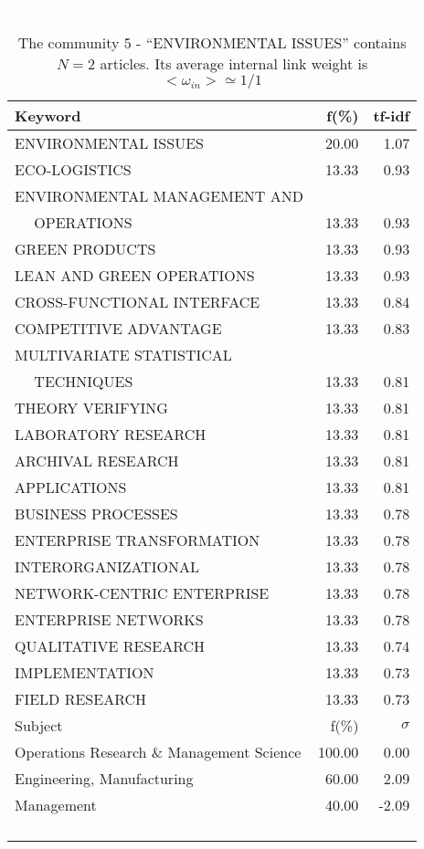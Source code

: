 \documentclass[a4paper,11pt]{report}
\begin{document}
\begin{landscape}
\begin{table}[!ht]
\caption{The community 5 - ``ENVIRONMENTAL ISSUES'' contains $N = 2$ articles. Its average internal link weight is $<\omega_{in}> \simeq 1/1$ }
\textcolor{white}{aa}\\
{\scriptsize\begin{tabular}{|l r  r|}
\hline
Keyword & f(\%) & tf-idf \\
\hline
ENVIRONMENTAL ISSUES & 20.00 & 1.07\\
ECO-LOGISTICS & 13.33 & 0.93\\
ENVIRONMENTAL MANAGEMENT AND &  &\\
$\quad$ OPERATIONS & 13.33 & 0.93\\
GREEN PRODUCTS & 13.33 & 0.93\\
LEAN AND GREEN OPERATIONS & 13.33 & 0.93\\
CROSS-FUNCTIONAL INTERFACE & 13.33 & 0.84\\
COMPETITIVE ADVANTAGE & 13.33 & 0.83\\
MULTIVARIATE STATISTICAL &  &\\
$\quad$ TECHNIQUES & 13.33 & 0.81\\
THEORY VERIFYING & 13.33 & 0.81\\
LABORATORY RESEARCH & 13.33 & 0.81\\
ARCHIVAL RESEARCH & 13.33 & 0.81\\
APPLICATIONS & 13.33 & 0.81\\
BUSINESS PROCESSES & 13.33 & 0.78\\
ENTERPRISE TRANSFORMATION & 13.33 & 0.78\\
INTERORGANIZATIONAL & 13.33 & 0.78\\
NETWORK-CENTRIC ENTERPRISE & 13.33 & 0.78\\
ENTERPRISE NETWORKS & 13.33 & 0.78\\
QUALITATIVE RESEARCH & 13.33 & 0.74\\
IMPLEMENTATION & 13.33 & 0.73\\
FIELD RESEARCH & 13.33 & 0.73\\
\hline
\hline
Subject & f(\%) & $\sigma$\\
\hline
Operations Research \& Management Science & 100.00 & 0.00\\
Engineering, Manufacturing & 60.00 & 2.09\\
Management & 40.00 & -2.09\\
 &  & \\
 &  & \\
 &  & \\
 &  & \\

\end{tabular}}
\end{table}
\end{landscape}
\end{document}
